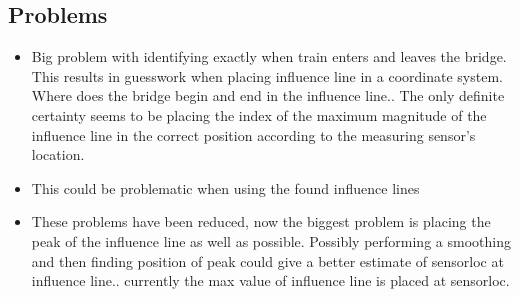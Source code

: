 \subsection{Problems}
\begin{itemize}
\item Big problem with identifying exactly when train enters and leaves the bridge. This results in guesswork when placing influence line in a coordinate system. Where does the bridge begin and end in the influence line.. The only definite certainty seems to be placing the index of the maximum magnitude of the influence line in the correct position according to the measuring sensor's location.
\item This could be problematic when using the found influence lines
\item These problems have been reduced, now the biggest problem is placing the peak of the influence line as well as possible. Possibly performing a smoothing and then finding position of peak could give a better estimate of sensorloc at influence line.. currently the max value of influence line is placed at sensorloc.
\end{itemize}





